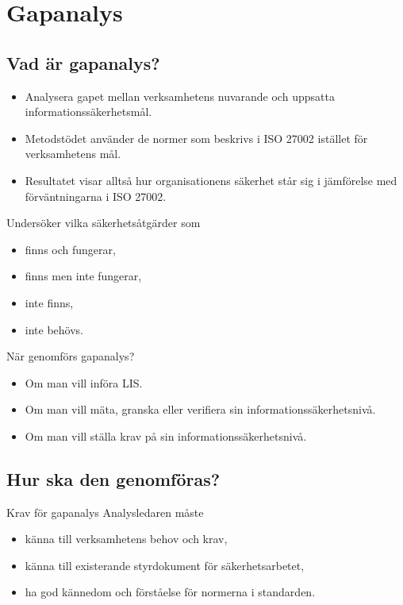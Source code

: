 \documentclass{beamer}
\begin{document}
\section{Gapanalys}

\subsection{Vad är gapanalys?}

\begin{frame}
  \begin{itemize}
    \item Analysera gapet mellan verksamhetens nuvarande och uppsatta 
      informationssäkerhetsmål.
    \item Metodstödet använder de normer som beskrivs i ISO 27002 istället för 
      verksamhetens mål.
    \item Resultatet visar alltså hur organisationens säkerhet står sig 
      i jämförelse med förväntningarna i ISO 27002.
  \end{itemize}
\end{frame}

\begin{frame}
  Undersöker vilka säkerhetsåtgärder som
  \begin{itemize}
    \item finns och fungerar,
    \item finns men inte fungerar,
    \item inte finns,
    \item inte behövs.
  \end{itemize}
\end{frame}

\begin{frame}{När genomförs gapanalys?}
  \begin{itemize}
    \item Om man vill införa LIS\@.
    \item Om man vill mäta, granska eller verifiera sin 
      informationssäkerhetsnivå.
    \item Om man vill ställa krav på sin informationssäkerhetsnivå.
  \end{itemize}
\end{frame}

\subsection{Hur ska den genomföras?}

\begin{frame}{Krav för gapanalys}
  Analysledaren måste
  \begin{itemize}
    \item känna till verksamhetens behov och krav,
    \item känna till existerande styrdokument för säkerhetsarbetet,
    \item ha god kännedom och förståelse för normerna i standarden.
  \end{itemize}
\end{frame}
\end{document}

